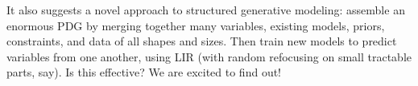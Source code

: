 It also suggests a novel approach to structured generative modeling:
assemble an enormous PDG by merging together
    many variables, existing models, priors,
    constraints, and data of all shapes and sizes.
Then train new models to predict variables from one another,
    using LIR (with random refocusing on small tractable parts, say).
Is this effective?  We are excited to find out!


% 
% 

\clearpage
